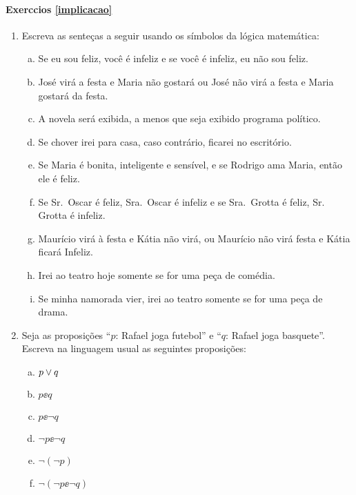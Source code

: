 \paragraph{Exerc\ih cios \ref{implicacao}}

\begin{enumerate}[{\bf 1.}]
\item Escreva as sente\c{c}as a seguir usando os s\'imbolos da lógica matemática:

\begin{enumerate}[a)] 
\item Se eu sou feliz, voc\^e \'e infeliz e se voc\^e \'e infeliz, eu n\~ao
sou feliz.
\item Jos\'e vir\'a a festa e Maria n\~ao gostar\'a ou Jos\'e n\~ao vir\'a a
festa e Maria gostar\'a da festa.
\item A novela ser\'a exibida, a menos que seja exibido programa pol\'itico.
\item Se chover irei para casa, caso contr\'ario, ficarei no escrit\'orio.
\item Se Maria \'e bonita, inteligente e sens\'ivel, e se Rodrigo ama Maria,
ent\~ao ele \'e feliz.
\item Se Sr.~Oscar \'e feliz, Sra.~Oscar \'e infeliz e se Sra.~Grotta \'e
feliz, Sr. Grotta \'e infeliz.
\item Maur\'icio vir\'a \`a festa e K\'atia n\~ao vir\'a, ou Maur\'icio n\~ao
vir\'a festa e K\'atia ficar\'a Infeliz.
\item Irei ao teatro hoje somente se for uma pe\c{c}a de com\'edia.
\item Se minha namorada vier, irei ao teatro somente se for uma pe\c{c}a de
drama.
\end{enumerate}

\item Seja as proposi\c{c}\~oes ``$p$: Rafael joga futebol'' e ``$q$: Rafael joga
basquete''. Escreva na linguagem usual as seguintes proposi\c{c}\~oes:
\begin{multicols}{2}
\begin{enumerate}[a)]
\item $p\vee q $
\item $p\ee q$
\item $p\ee \neg q $
\item $\neg p \ee \neg q$
\item $\neg(\neg p)$  
\item $\neg (\neg p \ee \neg q)$
\end{enumerate}
\end{multicols}



\end{enumerate}
